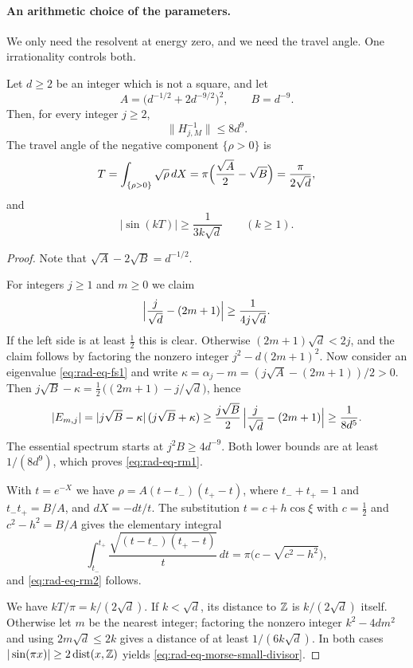 \paragraph{An arithmetic choice of the parameters.}
We only need the resolvent at energy zero, and we need the travel
angle. One irrationality controls both.

\begin{lemma}
\label{lem:morse-arithmetic}
Let $d\ge2$ be an integer which is not a square, and let
\begin{equation}\label{eq:rad-eq-rm5}
 A=\bigl(d^{-1/2}+2d^{-9/2}\bigr)^2,
 \qquad B=d^{-9}.
\end{equation}
Then, for every integer $j\ge2$,
\begin{equation}\label{eq:rad-eq-rm1}
 \|H_{j,M}^{-1}\|\le8d^9 .
\end{equation}
The travel angle of the negative component $\{\rho>0\}$ is
\begin{equation}\label{eq:rad-eq-rm2}
 T=\int_{\{\rho>0\}}\sqrt\rho\,dX
   =\pi\Bigl(\frac{\sqrt A}2-\sqrt B\Bigr)=\frac\pi{2\sqrt d},
\end{equation}
and
\begin{equation}\label{eq:rad-eq-morse-small-divisor}
 |\sin(kT)|\ge\frac1{3k\sqrt d}\qquad(k\ge1).
\end{equation}
\end{lemma}

\begin{proof}
Note that $\sqrt A-2\sqrt B=d^{-1/2}$.

For integers $j\ge1$ and $m\ge0$ we claim
\[
 \Bigl|\frac j{\sqrt d}-(2m+1)\Bigr|\ge\frac1{4j\sqrt d}.
\]
If the left side is at least $\tfrac12$ this is clear. Otherwise
$(2m+1)\sqrt d<2j$, and the claim follows by factoring the nonzero
integer $j^2-d(2m+1)^2$. Now consider an eigenvalue
\eqref{eq:rad-eq-fs1} and write
$\kappa=\alpha_j-m=(j\sqrt A-(2m+1))/2>0$. Then
$j\sqrt B-\kappa=\tfrac12\,\bigl((2m+1)-j/\sqrt d\bigr)$, hence
\[
 |E_{m,j}|=|j\sqrt B-\kappa|\,(j\sqrt B+\kappa)
 \ge\frac{j\sqrt B}{2}\,\Bigl|\frac j{\sqrt d}-(2m+1)\Bigr|
 \ge\frac1{8d^5}.
\]
The essential spectrum starts at $j^2B\ge4d^{-9}$. Both lower bounds
are at least $1/(8d^9)$, which proves \eqref{eq:rad-eq-rm1}.

With $t=e^{-X}$ we have $\rho=A(t-t_-)(t_+-t)$, where $t_-+t_+=1$ and
$t_-t_+=B/A$, and $dX=-dt/t$. The substitution $t=c+h\cos\xi$ with
$c=\tfrac12$ and $c^2-h^2=B/A$ gives the elementary integral
\[
 \int_{t_-}^{t_+}\frac{\sqrt{(t-t_-)(t_+-t)}}{t}\,dt
 =\pi\bigl(c-\sqrt{c^2-h^2}\bigr),
\]
and \eqref{eq:rad-eq-rm2} follows.

We have $kT/\pi=k/(2\sqrt d)$. If $k<\sqrt d$, its distance to $\mathbb Z$ is
$k/(2\sqrt d)$ itself. Otherwise let $m$ be the nearest integer;
factoring the nonzero integer $k^2-4dm^2$ and using
$2m\sqrt d\le2k$ gives a distance of at least $1/(6k\sqrt d)$. In both
cases $|\sin(\pi x)|\ge2\operatorname{dist}(x,\mathbb Z)$ yields
\eqref{eq:rad-eq-morse-small-divisor}.
\end{proof}

